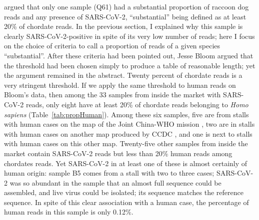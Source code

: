 \documentclass[11pt]{article}
\def \sct {\mbox{SARS-CoV-2}}
\begin{document}
 argued that only one sample (Q61) had a substantial proportion of raccoon dog reads and any presence of \sct{}, ``substantial'' being defined as at least 20\% of chordate reads. In the previous section, I explained why this sample is clearly \sct{}-positive in spite of its very low number of reads; here I focus on the choice of criteria to call a proportion of reads of a given species ``substantial''. After these criteria had been pointed out, Jesse Bloom argued that the threshold had been chosen simply to produce a table of reasonable length; yet the argument remained in the abstract. Twenty percent of chordate reads is a very stringent threshold. If we apply the same threshold to human reads on Bloom's data, then among the 33 samples from inside the market with \sct{} reads, only eight have at least 20\% of chordate reads belonging to \textit{Homo sapiens} (Table~\ref{tab:propHuman}). Among these six samples, five are from stalls with human cases on the map of the Joint China-WHO mission \citep{WHO2021}, two are in stalls with human cases on another map produced by CCDC \citep{Koopmans2021BMJ}, and one is next to stalls with human cases on this other map. Twenty-five other samples from inside the market contain \sct{} reads but less than 20\% human reads among chordates reads. Yet \sct{} in at least one of these is almost certainly of human origin: sample B5 comes from a stall with two to three cases; \sct{} was so abundant in the sample that an almost full sequence could be assembled, and live virus could be isolated; its sequence matches the reference sequence. In spite of this clear association with a human case, the percentage of human reads in this sample is only 0.12\%.
 
\end{document}
